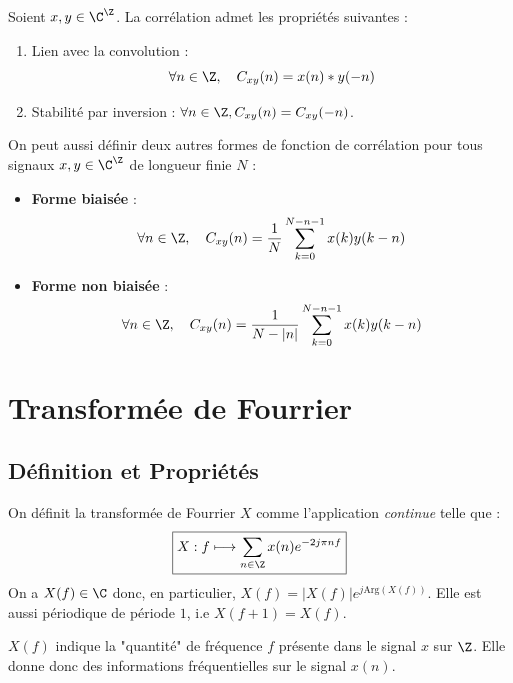 \begin{prop}[Corrélation]
    Soient $x,y \in \C^\Z$. La corrélation admet les propriétés suivantes : 
    \begin{enumerate}[label=\roman*)]
        \item Lien avec la convolution : 
            \begin{equation}
                \forall n \in \Z, \quad C_{xy}(n) = x(n) * y(-n)
            \end{equation}
        \item Stabilité par inversion : $ \forall n \in \Z, C_{xy}(n) = C_{xy}(-n)$.
    \end{enumerate}
\end{prop}

\begin{proposition}
    On peut aussi définir deux autres formes de fonction de corrélation pour tous signaux $x,y \in \C^\Z$ 
    de longueur finie $N$ :
    \begin{itemize}
        \item \textbf{Forme biaisée} : 
            \begin{equation}
                \forall n \in \Z, \quad C_{xy}(n) = \frac{1}{N} \sum_{k=0}^{N - n -1} x(k) y(k - n)
            \end{equation}
        \item \textbf{Forme non biaisée} : 
            \begin{equation}
                \forall n \in \Z, \quad C_{xy}(n) = \frac{1}{N - |n|} \sum_{k=0}^{N - n -1} x(k) y(k - n)
            \end{equation}
    \end{itemize}

\end{proposition}


\section{Transformée de Fourrier}

\subsection{Définition et Propriétés}

\begin{definition}
    On définit la transformée de Fourrier $X$ comme l'application \emph{continue} telle que : 
        $$ \boxed{X : f \longmapsto 
            \sum_{n \in \Z} x(n) e^{-2j \pi n f }} 
        $$
    On a $ X(f) \in \C$ donc, en particulier, $X(f) = |X(f)| e^{j \text{Arg} (X(f))}$. Elle est 
    aussi périodique de période $1$, i.e $X(f + 1) = X(f)$.

    $X(f)$ indique la "quantité" de fréquence $f$ présente dans le signal $x$ sur $ \Z$. 
    Elle donne donc des informations fréquentielles sur le signal $x(n)$. 
\end{definition}

